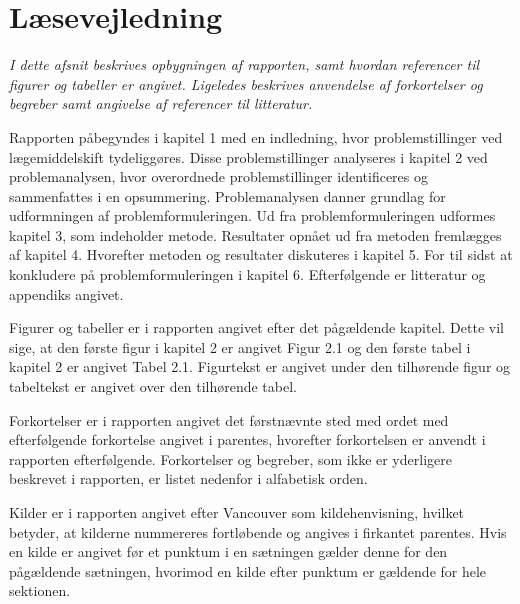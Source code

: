\section*{Læsevejledning}
\textit{I dette afsnit beskrives opbygningen af rapporten, samt hvordan referencer til figurer og tabeller er angivet. Ligeledes beskrives anvendelse af forkortelser og begreber samt angivelse af referencer til litteratur.}

Rapporten påbegyndes i kapitel 1 med en indledning, hvor problemstillinger ved lægemiddelskift tydeliggøres. Disse problemstillinger analyseres i kapitel 2 ved problemanalysen, hvor overordnede problemstillinger identificeres og sammenfattes i en opsummering. Problemanalysen danner grundlag for udformningen af problemformuleringen. Ud fra problemformuleringen udformes kapitel 3, som indeholder metode.  Resultater opnået ud fra metoden fremlægges af kapitel 4. Hvorefter metoden og resultater diskuteres i kapitel 5. For til sidst at konkludere på problemformuleringen i kapitel 6. Efterfølgende er litteratur og appendiks angivet.

Figurer og tabeller er i rapporten angivet efter det pågældende kapitel. Dette vil sige, at den første figur i kapitel 2 er angivet Figur 2.1 og den første tabel i kapitel 2 er angivet Tabel 2.1. Figurtekst er angivet under den tilhørende figur og tabeltekst er angivet over den tilhørende tabel. 

Forkortelser er i rapporten angivet det førstnævnte sted med ordet med efterfølgende forkortelse angivet i parentes, hvorefter forkortelsen er anvendt i rapporten efterfølgende. Forkortelser og begreber, som ikke er yderligere beskrevet i rapporten, er listet nedenfor i alfabetisk orden.

Kilder er i rapporten angivet efter Vancouver som kildehenvisning, hvilket betyder, at kilderne nummereres fortløbende og angives i firkantet parentes. Hvis en kilde er angivet før et punktum i en sætningen gælder denne for den pågældende sætningen, hvorimod en kilde efter punktum er gældende for hele sektionen.

